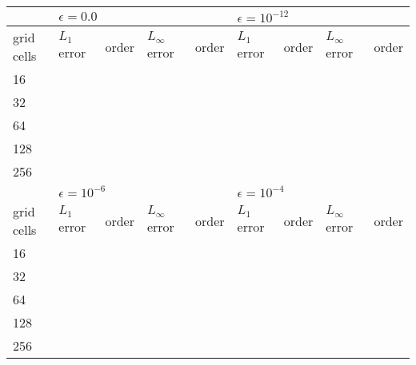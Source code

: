 \documentclass[12pt,letterpaper]{article}
\begin{document}
        \begin{center}\vspace{1cm}
        \begin{tabular}{|l|l|l|l|l|l|l|l|l|}
        \hline
                   & \multicolumn{4}{l|}{$\epsilon = 0.0$}              & \multicolumn{4}{l|}{$\epsilon = 10^{-12}$}         \\ \hline
        grid cells & $L_{1}$ error & order & $L_{\infty}$ error & order & $L_{1}$ error & order & $L_{\infty}$ error & order \\ \hline
        16         &               &       &                    &       &               &       &                    &       \\ \hline
        32         &               &       &                    &       &               &       &                    &       \\ \hline
        64         &               &       &                    &       &               &       &                    &       \\ \hline
        128        &               &       &                    &       &               &       &                    &       \\ \hline
        256        &               &       &                    &       &               &       &                    &       \\ \hline
                   & \multicolumn{4}{l|}{$\epsilon = 10^{-6}$}          & \multicolumn{4}{l|}{$\epsilon = 10^{-4}$}          \\ \hline
        grid cells & $L_{1}$ error & order & $L_{\infty}$ error & order & $L_{1}$ error & order & $L_{\infty}$ error & order \\ \hline
        16         &               &       &                    &       &               &       &                    &       \\ \hline
        32         &               &       &                    &       &               &       &                    &       \\ \hline
        64         &               &       &                    &       &               &       &                    &       \\ \hline
        128        &               &       &                    &       &               &       &                    &       \\ \hline
        256        &               &       &                    &       &               &       &                    &       \\ \hline
        \end{tabular}
        \end{center}\vspace{1cm}
\end{document}
